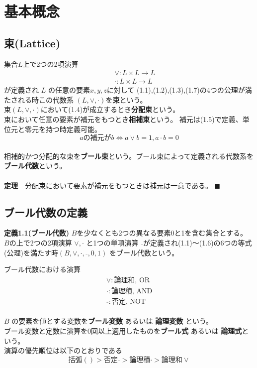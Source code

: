 \documentclass[a4j,10pt,oneside,openany,fleqn]{jsbook}
\begin{document}
\section{基本概念}
\subsection{束(Lattice)}
集合$L$上で2つの2項演算
\begin{eqnarray*}
  &&\vee : L \times L \rightarrow L \\
  &&\cdot : L \times L \rightarrow L 
\end{eqnarray*}
が定義され $L$ の任意の要素$x, y, z$に対して
(1.1),(1.2),(1.3),(1.7)の4つの公理が満たされる時この代数系 $(L, \vee, \cdot)$を\textbf{束}という。\\
束$(L, \vee, \cdot)$において(1.4)が成立するとき\textbf{分配束}という。\\
束において任意の要素が補元をもつとき\textbf{相補束}という。
補元は(1.5)で定義、単位元と零元を持つ時定義可能。
\[a \textrm{の補元が} b \Leftrightarrow a \vee b = 1, a \cdot b = 0 \]
\\
相補的かつ分配的な束を\textbf{ブール束}という。ブール束によって定義される代数系を\textbf{ブール代数}という。\\
\\
\textbf{定理}　分配束において要素が補元をもつときは補元は一意である。 $\blacksquare$

\subsection{ブール代数の定義}
\textbf{定義1.1(ブール代数)}
$B$を少なくとも2つの異なる要素0と1を含む集合とする。
$B$の上で2つの2項演算 $\vee , \cdot$ と1つの単項演算 $\overline{　}$が定義され(1.1)〜(1.6)の6つの等式(公理)を満たす時$(B, \vee, \cdot, \overline{　}, 0, 1)$ をブール代数という。

ブール代数における演算
\begin{align*}
&\vee:\textrm{論理和, OR}\\
&\cdot: \textrm{論理積, AND}&\\
&\overline{　}:\textrm{否定, NOT}&
\end{align*}
\\
$B$ の要素を値とする変数を\textbf{ブール変数} あるいは \textbf{論理変数} という。\\
ブール変数と定数に演算を0回以上適用したものを\textbf{ブール式} あるいは \textbf{論理式}という。\\
演算の優先順位は以下のとおりである\\
\[ \textrm{括弧}() > \textrm{否定}\overline{　} > \textrm{論理積}\cdot > \textrm{論理和} \vee \]
\end{document}
